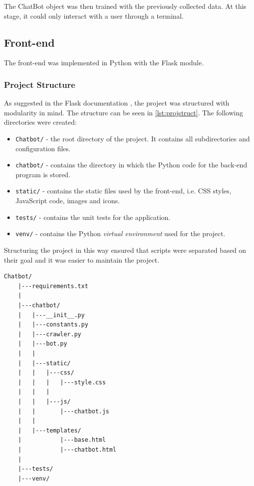 \documentclass[12pt,a4paper]{article}
\newcommand{\captionstyle}[1] {
    \small{#1}
}
\begin{document}
The ChatBot object was then trained with the previously collected data. At this stage, it could only interact with a user through a terminal.

\subsection{Front-end}
The front-end was implemented in Python with the Flask module.

\subsubsection{Project Structure}
As suggested in the Flask documentation \citep{Flask:online}, the project was structured with modularity in mind. The structure can be seen in \cref{lst:projstruct}. The following directories were created:

\begin{itemize}
	\item \texttt{Chatbot/} - the root directory of the project. It contains all subdirectories and configuration files.
	\item \texttt{chatbot/} - contains the directory in which the Python code for the back-end program is stored.
	\item \texttt{static/} - contains the static files used by the front-end, i.e. CSS styles, JavaScript code, images and icons.
	\item \texttt{tests/} - contains the unit tests for the application.
	\item \texttt{venv/} - contains the Python \textit{virtual environment} used for the project.
\end{itemize}

Structuring the project in this way ensured that scripts were separated based on their goal and it was easier to maintain the project.

\begin{minipage}{\linewidth}
	\begin{lstlisting}[caption={\captionstyle{The file structure of the project.}}, label={lst:projstruct},numbers=none]
	Chatbot/
	|---requirements.txt
	|   
	|---chatbot/
	|   |---__init__.py
	|   |---constants.py
	|   |---crawler.py
	|   |---bot.py
	|   |   
	|   |---static/
	|   |   |---css/
	|   |   |   |---style.css
	|   |   |       
	|   |   |---js/
	|   |       |---chatbot.js
	|   |           
	|   |---templates/
	|           |---base.html
	|           |---chatbot.html
	|           
	|---tests/
	|---venv/    
	\end{lstlisting}
\end{minipage}
\end{document}

